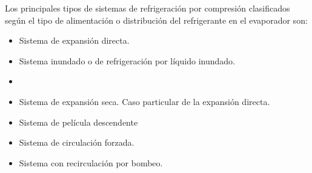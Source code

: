 	Los principales tipos de sistemas de refrigeración por compresión clasificados según el tipo de alimentación o distribución del refrigerante en el evaporador son:
	\begin{itemize}
		\item Sistema de expansión directa.
		\item Sistema inundado o de refrigeración por líquido inundado.
		\item {}
		\item Sistema de expansión seca. Caso particular de la expansión directa.
		\item Sistema de película descendente
		\item Sistema de circulación forzada.
		\item Sistema con recirculación por bombeo.
	\end{itemize}
	
	
	
	
	
	

